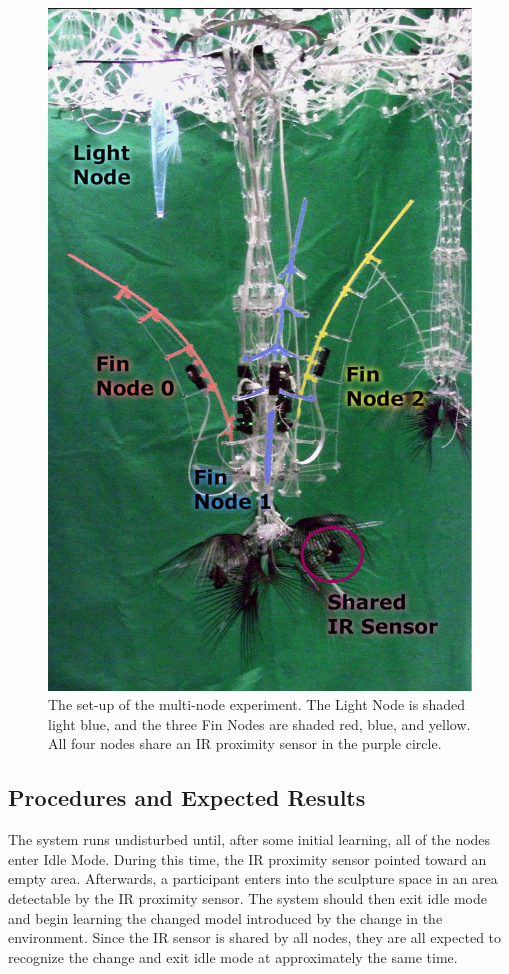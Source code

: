 \begin{figure} [!htbp]
	\centering
	\includegraphics[height=0.8\textheight]{"fig/validations/Single_Cluster Set-up"}
	\caption[Photograph of the set up of the multi-node experiment]{The set-up of the multi-node experiment. The Light Node is shaded light blue, and the three Fin Nodes are shaded red, blue, and yellow. All four nodes share an IR proximity sensor in the purple circle.}
	\label{fig:Single_Cluster Set-up}
\end{figure}

\subsection{Procedures and Expected Results}
The system runs undisturbed until, after some initial learning, all of the nodes enter Idle Mode.  During this time, the IR proximity sensor pointed toward an empty area. Afterwards, a participant enters into the sculpture space in an area detectable by the IR proximity sensor. The system should then exit idle mode and begin learning the changed model introduced by the change in the environment.  Since the IR sensor is shared by all nodes, they are all expected to recognize the change and exit idle mode at approximately the same time. 

